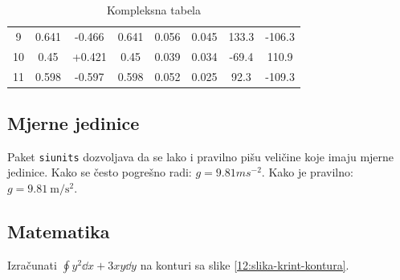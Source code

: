 \begin{table}[h]
\begin{tabular}{SSSSSSSS}
		9     & 0.641                                  & -0.466                                  & 0.641               & 0.056                          & 0.045   & 133.3                       & -106.3                     \\
		10    & 0.45                                   & +0.421                                  & 0.45                & 0.039                          & 0.034   & -69.4                       & 110.9                      \\
		11    & 0.598                                  & -0.597                                  & 0.598               & 0.052                          & 0.025   & 92.3                        & -109.3                     \\ \bottomrule
	\end{tabular}
	\caption{Kompleksna tabela}
\end{table}

\subsection{Mjerne jedinice}

Paket \texttt{siunits} dozvoljava da se lako i pravilno pišu veličine koje imaju mjerne jedinice. Kako se često pogrešno radi: $g = 9.81 ms^{-2}$.
Kako je pravilno: $g = \SI{9.81}{\meter\per\second\squared}$.

\subsection{Matematika}

\begin{zadatak}
	\label{12:zd-krint-kontura}
	Izračunati $\displaystyle \oint y^2 \dd{x} + 3xy \dd{y}$ na konturi sa slike \ref{12:slika-krint-kontura}.
\end{zadatak}

